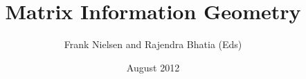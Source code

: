 \documentclass{article}
\begin{document}
\title{Matrix Information Geometry}
\author{Frank Nielsen and Rajendra Bhatia (Eds)}
\date{August 2012}

\maketitle
\nocite{*}



\end{document}
